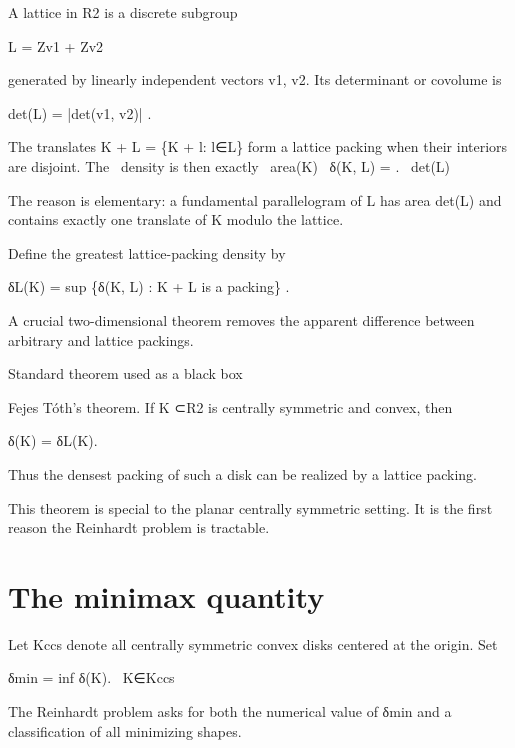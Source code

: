 A lattice in R2 is a discrete subgroup


L = Zv1 + Zv2


generated by linearly independent vectors v1, v2. Its determinant or covolume is


det(L) = |det(v1, v2)| .


\begin{displaytext}
The translates K + L = \{K + l: l∈L\} form a lattice packing when their interiors are disjoint. The \
density is then exactly \
area(K) \
δ(K, L) = . \
det(L)
\end{displaytext}

The reason is elementary: a fundamental parallelogram of L has area det(L) and contains exactly one translate of K modulo the lattice.


Define the greatest lattice-packing density by


\begin{displaytext}
δL(K) = sup \{δ(K, L) : K + L is a packing\} .
\end{displaytext}

A crucial two-dimensional theorem removes the apparent difference between arbitrary and lattice packings.


\begin{insightbox}{Standard theorem used as a black box}
\end{insightbox}

Fejes Tóth’s theorem. If K ⊂R2 is centrally symmetric and convex, then


\begin{displaytext}
δ(K) = δL(K).
\end{displaytext}

Thus the densest packing of such a disk can be realized by a lattice packing.


This theorem is special to the planar centrally symmetric setting. It is the first reason the Reinhardt problem is tractable.


\section{The minimax quantity}

Let Kccs denote all centrally symmetric convex disks centered at the origin. Set


\begin{displaytext}
δmin = inf δ(K). \
K∈Kccs
\end{displaytext}

The Reinhardt problem asks for both the numerical value of δmin and a classification of all minimizing shapes.


